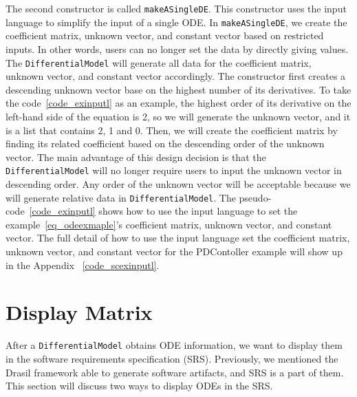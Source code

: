 The second constructor is called \verb|makeASingleDE|. This constructor uses the input language to simplify the input of a single ODE. In \verb|makeASingleDE|, we create the coefficient matrix, unknown vector, and constant vector based on restricted inputs. In other words, users can no longer set the data by directly giving values. The \verb|DifferentialModel| will generate all data for the coefficient matrix, unknown vector, and constant vector accordingly. The constructor first creates a descending unknown vector base on the highest number of its derivatives. To take the code~\ref{code_exinputl} as an example, the highest order of its derivative on the left-hand side of the equation is 2, so we will generate the unknown vector, and it is a list that contains 2, 1 and 0. Then, we will create the coefficient matrix by finding its related coefficient based on the descending order of the unknown vector. The main advantage of this design decision is that the \verb|DifferentialModel| will no longer require users to input the unknown vector in descending order. Any order of the unknown vector will be acceptable because we will generate relative data in \verb|DifferentialModel|. The pseudo-code~\ref{code_exinputl} shows how to use the input language to set the example~\ref{eq_odeexmaple}'s coefficient matrix, unknown vector, and constant vector. The full detail of how to use the input language set the coefficient matrix, unknown vector, and constant vector for the PDContoller example will show up in the Appendix ~\ref{code_scexinputl}.

\section{Display Matrix}
After a \verb|DifferentialModel| obtains ODE information, we want to display them in the software requirements specification (SRS). Previously, we mentioned the Drasil framework able to generate software artifacts, and SRS is a part of them. This section will discuss two ways to display ODEs in the SRS.

